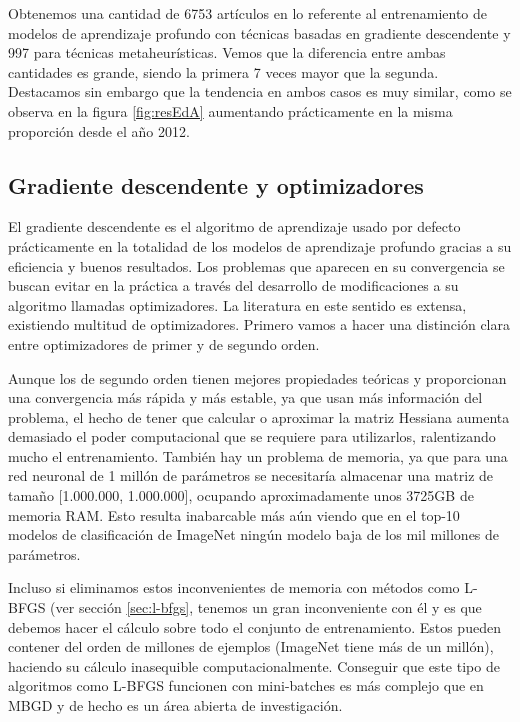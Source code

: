 Obtenemos una cantidad de 6753 artículos en lo referente al entrenamiento de modelos de aprendizaje profundo con técnicas basadas en gradiente descendente y 997 para técnicas metaheurísticas. Vemos que la diferencia entre ambas cantidades es grande, siendo la primera 7 veces mayor que la segunda. Destacamos sin embargo que la tendencia en ambos casos es muy similar, como se observa en la figura \ref{fig:resEdA} aumentando prácticamente en la misma proporción desde el año 2012.



\subsection{Gradiente descendente y optimizadores}

El gradiente descendente es el algoritmo de aprendizaje usado por defecto prácticamente en la totalidad de los modelos de aprendizaje profundo gracias a su eficiencia y buenos resultados. Los problemas que aparecen en su convergencia se buscan evitar en la práctica a través del desarrollo de modificaciones a su algoritmo llamadas optimizadores. La literatura en este sentido es extensa, existiendo multitud de optimizadores. Primero vamos a hacer una distinción clara entre optimizadores de primer y de segundo orden. 

Aunque los de segundo orden tienen mejores propiedades teóricas y proporcionan una convergencia más rápida y más estable, ya que usan más información del problema, el hecho de tener que calcular o aproximar la matriz Hessiana aumenta demasiado el poder computacional que se requiere para utilizarlos, ralentizando mucho el entrenamiento. También hay un problema de memoria, ya que para una red neuronal de 1 millón de parámetros se necesitaría almacenar una matriz de tamaño [1.000.000, 1.000.000], ocupando aproximadamente unos 3725GB de memoria RAM. Esto resulta inabarcable más aún viendo que en el top-10 modelos de clasificación de ImageNet ningún modelo baja de los mil millones de parámetros. 

Incluso si eliminamos estos inconvenientes de memoria con métodos como L-BFGS (ver sección \ref{sec:l-bfgs}, tenemos un gran inconveniente con él y es que debemos hacer el cálculo sobre todo el conjunto de entrenamiento. Estos pueden contener del orden de millones de ejemplos (ImageNet tiene más de un millón), haciendo su cálculo inasequible computacionalmente. Conseguir que este tipo de algoritmos como L-BFGS funcionen con mini-batches es más complejo que en MBGD y de hecho es un área abierta de investigación.

